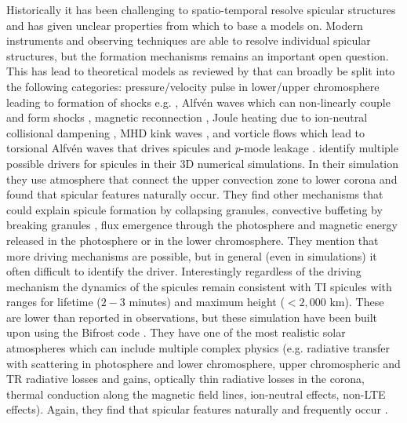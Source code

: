 \documentclass[12pt]{ociamthesis}
\newcommand{\Alfven}{Alfv\'{e}n }
\newcommand{\np}{\\ \\}
\begin{document}
Historically it has been challenging to spatio-temporal resolve spicular structures and has given unclear properties from which to base a models on. Modern instruments and observing techniques are able to resolve individual spicular structures, but the formation mechanisms remains an important open question. This has lead to theoretical models as reviewed by \cite{Sterling_2000SoPh} that can broadly be split into the following categories: pressure/velocity pulse in lower/upper chromosphere leading to formation of shocks e.g. \citep{Shibata1982,Suematsu1982SoPh7599S,Hollweg1982ApJ257345H,Sterling1990ApJ349647S,Heggland2007ApJ6661277H,kuzma2017ApJ84978K}, \Alfven waves which can non-linearly couple and form shocks \citep{Hollweg1982SoPh7535H,Hollweg1992ApJ389731H,Kudoh1999ApJ514493K,Matsumoto2010ApJ7101857M}, magnetic reconnection \citep{Yokoyama1995Natur37542Y,Yokoyama1996PASJ48353Y,Archontis2005ApJ6351299A,Pontieu2007PASJ,Isobe2008ApJ679L57I,Nishizuka2008ApJ683L83N,Sterling2010ApJ,Gonz2017ApJ,Gonz2018arXiv180704224G,Gonz2018ApJ856176G}, Joule heating due to ion-neutral collisional dampening \citep{Haerendel1992Natur360241H,James2003AA}, MHD kink waves \citep{Kukhianidze2006A&A}, and vorticle flows which lead to torsional \Alfven waves that drives spicules \citep{Iijima2017ApJ,Samanta2019Sci} and \textit{p}-mode leakage \citep{Pontieu2004Natur}. \cite{Mart2009ApJ7011569M} identify multiple possible drivers for spicules in their 3D numerical simulations. In their simulation they use atmosphere that connect the upper convection zone to lower corona and found that spicular features naturally occur. They find other mechanisms that could explain spicule formation by collapsing granules, convective buffeting by breaking granules \citep{Roberts1979SoPh6123R}, flux emergence through the photosphere and magnetic energy released in the photosphere or in the lower chromosphere. They mention that more driving mechanisms are possible, but in general (even in simulations) it often difficult to identify the driver. Interestingly regardless of the driving mechanism the dynamics of the spicules remain consistent with TI spicules with ranges for lifetime ($2-3$ minutes) and maximum height ($<2,000$ km). These are lower than reported in observations, but these simulation have been built upon \citep{Mart2017Sci3561269M,Mart2018ApJ860116M,Mart2020ApJ88995M} using the Bifrost code \citep{Gudiksen2011AA531A154G}. They have one of the most realistic solar atmospheres which can include multiple complex physics (e.g. radiative transfer with scattering in photosphere and lower chromosphere, upper chromospheric and TR radiative losses and gains, optically thin radiative losses in the corona, thermal conduction along the magnetic field lines, ion-neutral effects, non-LTE effects). Again, they find that spicular features naturally and frequently occur \citep{Mart2017Sci3561269M}. \np
\end{document}
